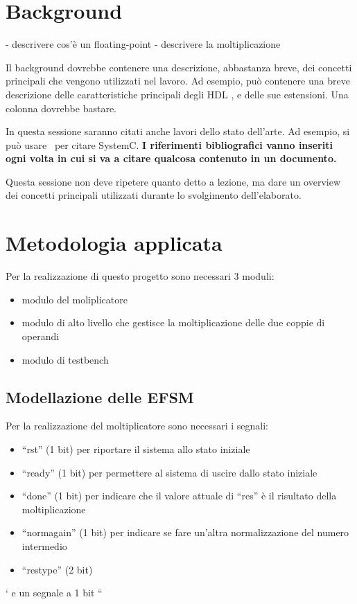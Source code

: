 \documentclass[]{IEEEtran}
\begin{document}
\section{Background}

- descrivere cos'è un floating-point
- descrivere la moltiplicazione

Il background dovrebbe contenere una descrizione, abbastanza breve, dei concetti principali che vengono utilizzati nel lavoro. Ad esempio, pu\`o contenere una breve descrizione delle caratteristiche principali degli HDL , e delle sue estensioni. Una colonna dovrebbe bastare.

In questa sessione saranno citati anche lavori dello stato dell'arte. Ad esempio, si pu\`o usare~\cite{SystemC} per citare SystemC. \textbf{I riferimenti bibliografici vanno inseriti ogni volta in cui si va a citare qualcosa contenuto in un documento.}

Questa sessione non deve ripetere quanto detto a lezione, ma dare un overview dei concetti principali utilizzati durante lo svolgimento dell'elaborato.


\section{Metodologia applicata}
Per la realizzazione di questo progetto sono necessari 3 moduli:
\begin{itemize}
\item modulo del moliplicatore
\item modulo di alto livello che gestisce la moltiplicazione delle due coppie di operandi
\item modulo di testbench
\end{itemize}

\subsection{Modellazione delle EFSM}
Per la realizzazione del moltiplicatore sono necessari i segnali:
\begin{itemize}
\item ``rst'' (1 bit) per riportare il sistema allo stato iniziale 
\item ``ready'' (1 bit) per permettere al sistema di uscire dallo stato iniziale 
\item ``done'' (1 bit) per indicare che il valore attuale di ``res'' è il risultato della moltiplicazione
\item ``norm\textunderscore again'' (1 bit) per indicare se fare un'altra normalizzazione del numero intermedio
\item ``res\textunderscore type'' (2 bit)
\end{itemize} ` e un segnale a 1 bit `` 
\end{document}
